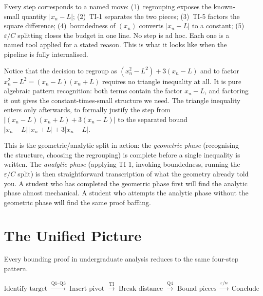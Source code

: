\begin{remark*}
Every step corresponds to a named move:
(1)~regrouping exposes the known-small quantity $|x_n - L|$;
(2)~TI-1 separates the two pieces;
(3)~TI-5 factors the square difference;
(4)~boundedness of $(x_n)$ converts $|x_n + L|$ to a constant;
(5)~$\varepsilon/C$ splitting closes the budget in one line.
No step is ad hoc.
Each one is a named tool applied for a stated reason.
This is what it looks like when the pipeline is fully internalised.
\end{remark*}

\begin{remark*}
Notice that the decision to regroup as $(x_n^2 - L^2) + 3(x_n - L)$
and to factor $x_n^2 - L^2 = (x_n - L)(x_n + L)$ requires no
triangle inequality at all.
It is pure algebraic pattern recognition: both terms contain the
factor $x_n - L$, and factoring it out gives the constant-times-small
structure we need.
The triangle inequality enters only afterwards, to formally justify
the step from $|(x_n - L)(x_n + L) + 3(x_n - L)|$ to the separated
bound $|x_n - L|\,|x_n + L| + 3|x_n - L|$.

This is the geometric/analytic split in action:
the \emph{geometric phase} (recognising the structure, choosing the
regrouping) is complete before a single inequality is written.
The \emph{analytic phase} (applying TI-1, invoking boundedness,
running the $\varepsilon/C$ split) is then straightforward transcription
of what the geometry already told you.
A student who has completed the geometric phase first will find the
analytic phase almost mechanical.
A student who attempts the analytic phase without the geometric phase
will find the same proof baffling.
\end{remark*}

\clearpage


\section{The Unified Picture}
\label{sec:unified-picture}

Every bounding proof in undergraduate analysis reduces to the same
four-step pattern.

\begin{tcolorbox}[colback=thmbox, colframe=thmborder, arc=2pt,
  left=8pt, right=8pt, top=6pt, bottom=6pt,
  title={\small\textbf{The Universal Bounding Pattern}},
  fonttitle=\small\bfseries]
\[
  \text{Identify target}
  \;\xrightarrow{\text{Q1--Q3}}\;
  \text{Insert pivot}
  \;\xrightarrow{\text{TI}}\;
  \text{Break distance}
  \;\xrightarrow{\text{Q4}}\;
  \text{Bound pieces}
  \;\xrightarrow{\varepsilon/n}\;
  \text{Conclude}
\]
\end{tcolorbox}

